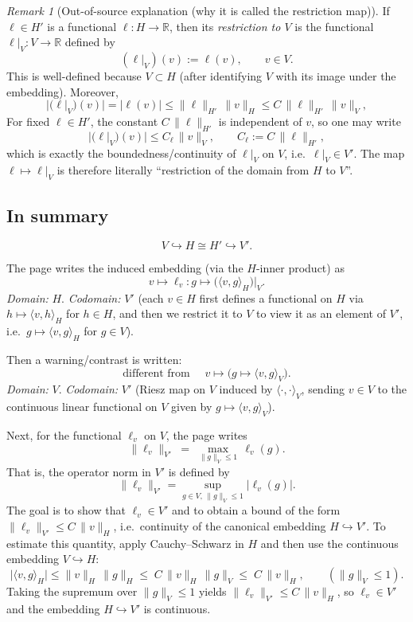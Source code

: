 \documentclass[11pt]{article}
\theoremstyle{definition}
\theoremstyle{remark}
\newtheorem{remark}{Remark}
\begin{document}
\begin{remark}[Out-of-source explanation (why it is called the restriction map)]
If $\ell\in H'$ is a functional $\ell:H\to\mathbb{R}$, then its \emph{restriction to $V$} is the functional $\ell|_V:V\to\mathbb{R}$ defined by
\[
(\ell|_V)(v):=\ell(v),
\qquad v\in V.
\]
This is well-defined because $V\subset H$ (after identifying $V$ with its image under the embedding). Moreover,
\[
|(\ell|_V)(v)|
=|\ell(v)|
\le \|\ell\|_{H'}\,\|v\|_H
\le C\,\|\ell\|_{H'}\,\|v\|_V,
\]
For fixed $\ell\in H'$, the constant $C\,\|\ell\|_{H'}$ is independent of $v$, so one may write
\[
|(\ell|_V)(v)| \le C_\ell\,\|v\|_V,
\qquad C_\ell:=C\,\|\ell\|_{H'},
\]
which is exactly the boundedness/continuity of $\ell|_V$ on $V$, i.e.\ $\ell|_V\in V'$. The map $\ell\mapsto \ell|_V$ is therefore literally ``restriction of the domain from $H$ to $V$''.
\end{remark}

\subsection*{In summary}

\[
V \hookrightarrow H \cong H' \hookrightarrow V'.
\]

The page writes the induced embedding (via the $H$-inner product) as
\[
v \longmapsto \ell_v : g \longmapsto \bigl(\langle v,g\rangle_H\bigr)\big|_V.
\]
\noindent
\emph{Domain:} $H$. \emph{Codomain:} $V'$ (each $v\in H$ first defines a functional on $H$ via $h\mapsto \langle v,h\rangle_H$ for $h\in H$, and then we restrict it to $V$ to view it as an element of $V'$, i.e.\ $g\mapsto \langle v,g\rangle_H$ for $g\in V$).

Then a warning/contrast is written:
\[
\text{different from } \quad
v \longmapsto \bigl(g \longmapsto \langle v,g\rangle_V\bigr).
\]
\noindent
\emph{Domain:} $V$. \emph{Codomain:} $V'$ (Riesz map on $V$ induced by $\langle\cdot,\cdot\rangle_V$, sending $v\in V$ to the continuous linear functional on $V$ given by $g\mapsto \langle v,g\rangle_V$).

Next, for the functional $\ell_v$ on $V$, the page writes
\[
\|\ell_v\|_{V'}
\;=\;
\max_{\|g\|_V\le 1}\,\ell_v(g).
\]
That is, the operator norm in $V'$ is defined by
\[
\|\ell_v\|_{V'}=\sup_{g\in V,\,\|g\|_V\le 1}|\ell_v(g)|.
\]
The goal is to show that $\ell_v\in V'$ and to obtain a bound of the form $\|\ell_v\|_{V'}\le C\,\|v\|_H$, i.e.\ continuity of the canonical embedding $H\hookrightarrow V'$.
To estimate this quantity, apply Cauchy--Schwarz in $H$ and then use the continuous embedding $V\hookrightarrow H$:
\[
\bigl|\langle v,g\rangle_H\bigr|
\le
\|v\|_H\,\|g\|_H
\le
\;C\,\|v\|_H\,\|g\|_V
\le
\;C\,\|v\|_H,
\qquad (\|g\|_V\le 1).
\]
Taking the supremum over $\|g\|_V\le 1$ yields $\|\ell_v\|_{V'}\le C\,\|v\|_H$, so $\ell_v\in V'$ and the embedding $H\hookrightarrow V'$ is continuous.
\end{document}
